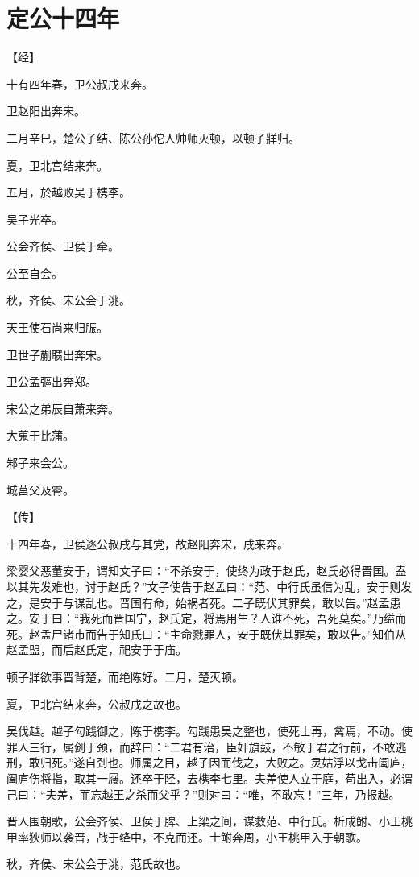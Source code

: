 \documentclass[a4paper,12pt,UTF8,twoside]{ctexbook}
\begin{document}
\section{定公十四年}


【经】

十有四年春，卫公叔戌来奔。

卫赵阳出奔宋。

二月辛巳，楚公子结、陈公孙佗人帅师灭顿，以顿子牂归。

夏，卫北宫结来奔。

五月，於越败吴于槜李。

吴子光卒。

公会齐侯、卫侯于牵。

公至自会。

秋，齐侯、宋公会于洮。

天王使石尚来归脤。

卫世子蒯聩出奔宋。

卫公孟彄出奔郑。

宋公之弟辰自萧来奔。

大蒐于比蒲。

邾子来会公。

城莒父及霄。

【传】

十四年春，卫侯逐公叔戌与其党，故赵阳奔宋，戌来奔。

梁婴父恶董安于，谓知文子曰：“不杀安于，使终为政于赵氏，赵氏必得晋国。盍以其先发难也，讨于赵氏？”文子使告于赵孟曰：“范、中行氏虽信为乱，安于则发之，是安于与谋乱也。晋国有命，始祸者死。二子既伏其罪矣，敢以告。”赵孟患之。安于曰：“我死而晋国宁，赵氏定，将焉用生？人谁不死，吾死莫矣。”乃缢而死。赵孟尸诸市而告于知氏曰：“主命戮罪人，安于既伏其罪矣，敢以告。”知伯从赵孟盟，而后赵氏定，祀安于于庙。

顿子牂欲事晋背楚，而绝陈好。二月，楚灭顿。

夏，卫北宫结来奔，公叔戌之故也。

吴伐越。越子勾践御之，陈于槜李。勾践患吴之整也，使死士再，禽焉，不动。使罪人三行，属剑于颈，而辞曰：“二君有治，臣奸旗鼓，不敏于君之行前，不敢逃刑，敢归死。”遂自刭也。师属之目，越子因而伐之，大败之。灵姑浮以戈击阖庐，阖庐伤将指，取其一屦。还卒于陉，去槜李七里。夫差使人立于庭，苟出入，必谓己曰：“夫差，而忘越王之杀而父乎？”则对曰：“唯，不敢忘！”三年，乃报越。

晋人围朝歌，公会齐侯、卫侯于脾、上梁之间，谋救范、中行氏。析成鲋、小王桃甲率狄师以袭晋，战于绛中，不克而还。士鲋奔周，小王桃甲入于朝歌。

秋，齐侯、宋公会于洮，范氏故也。
\end{document}
